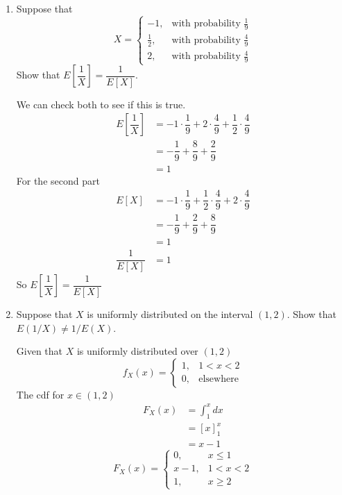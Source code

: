 \documentclass[11pt]{article}
\begin{document}
\begin{enumerate}[label=(\alph*)]
    \item Suppose that
    \[
        X =
        \begin{cases}
            -1, & \text{with probability } \frac{1}{9} \\
            \frac{1}{2}, & \text{with probability } \frac{4}{9} \\
            2, & \text{with probability } \frac{4}{9}
        \end{cases}
    \]
    Show that $E\!\left[\dfrac{1}{X}\right] = \dfrac{1}{E[X]}$.
    \begin{solution}

        We can check both to see if this is true.
        \begin{align*}
            E\!\left[\dfrac{1}{X}\right] &= -1\cdot\dfrac{1}{9} + 2\cdot\dfrac{4}{9} + \dfrac{1}{2}\cdot\dfrac{4}{9} \\
            &= -\dfrac{1}{9} + \dfrac{8}{9} + \dfrac{2}{9} \\
            &= 1
        \end{align*}
        For the second part
        \begin{align*}
            E[X] &= -1\cdot\dfrac{1}{9} + \dfrac{1}{2}\cdot\dfrac{4}{9} + 2\cdot\dfrac{4}{9} \\
            &= -\dfrac{1}{9} + \dfrac{2}{9} + \dfrac{8}{9} \\
            &= 1 \\
            \dfrac{1}{E[X]} &= 1
        \end{align*}
        So $E\!\left[\dfrac{1}{X}\right] = \dfrac{1}{E[X]}$
    \end{solution}

    \vspace{5em}

    \item Suppose that $X$ is uniformly distributed on the interval $(1,2)$. Show that $E(1/X) \neq 1/E(X)$.
    \begin{solution}

        Given that $X$ is uniformly distributed over $(1, 2)$
        \[
            f_X(x) =
            \begin{cases}
                1, & 1 < x < 2 \\
                0, & \text{elsewhere}
            \end{cases}
        \]
        The cdf for $x \in (1, 2)$
        \begin{align*}
            F_X(x) &= \int_{1}^{x} dx \\
            &= \left[x\right]_{1}^{x} \\
            &= x - 1
        \end{align*}
        \[
            F_X(x) =
            \begin{cases}
                0, & x \leq 1 \\
                x - 1, & 1 < x < 2 \\
                1, & x \geq 2
            \end{cases}
        \]


\end{solution}
\end{enumerate}
\end{document}

